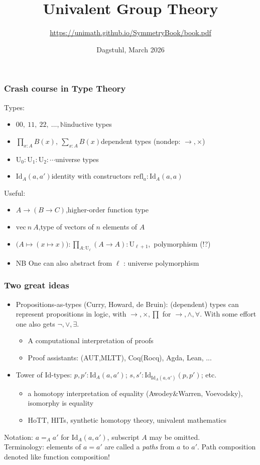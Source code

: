 \documentclass[handout,11pt]{beamer}
\title{Univalent Group Theory}
\author{\url{https://unimath.github.io/SymmetryBook/book.pdf}
}
\date{Dagstuhl, March 2026}
\newcommand{\UU}{\mathrm{U}}
\newcommand{\refl}{\mathrm{refl}}
\newcommand{\NN}{\mathbb{N}}
\newcommand{\bn}[1]{{{#1\!\!\!#1}}}
\newcommand{\Id}{\mathrm{Id}}
\newcommand{\vectype}[2]{\mathrm{vec}~#1~#2}
\begin{document}
\maketitle


\begin{frame}
\frametitle{Crash course in Type Theory}
Types:
 \begin{itemize}[<+->]
\item $\bn{0},~\bn{1},~\bn2,~\ldots,\NN$\quad inductive types
\item $\prod_{x:A}B(x),\ \sum_{x:A}B(x)$\quad dependent types (nondep: $\to,\times$)
\item $\UU_0 : \UU_1 : \UU_2 : \cdots$\quad universe types
\item $\Id_A(a,a')$\quad identity with constructors $\refl_a:\Id_A(a,a)$
\end{itemize}
Useful:
\begin{itemize}[<+->]
\item $A\to(B\to C)$,\quad higher-order function type
\item $\vectype n A$,\quad type of vectors of $n$ elements of $A$
\item $\bigl(A\mapsto (x \mapsto x)\bigr):\prod_{A:\UU_\ell}(A\to A):\UU_{\ell+1}$,\quad polymorphism (!?)
\item NB One can also abstract from $\ell$ : universe polymorphism 
\end{itemize}
\end{frame}

\begin{frame}
\frametitle{Two great ideas}
\begin{itemize}[<+->]
\item Propositions-as-types (Curry, Howard, de Bruin): 
(dependent) types can represent propositions
in logic, with $\to,\times,\prod$ for $\to,\land,\forall$. 
With some effort one also gets $\neg,\lor,\exists$.
\begin{itemize}[<+->]
\item A computational interpretation of proofs
\item Proof assistants: (AUT,MLTT), Coq(Rocq), Agda, Lean, ...
\end{itemize}
\item Tower of $\Id$-types: $p,p':\Id_A(a,a')$; 
$s,s':\Id_{\Id_A(a,a')}(p,p')$; etc.
\begin{itemize}[<+->]
\item a homotopy interpretation of equality (Awodey\&Warren, Voevodsky),
isomorphy is equality
\item HoTT, HITs, synthetic homotopy theory, univalent mathematics
\end{itemize} 
\end{itemize}
\vspace*{1cm}
Notation: $a=_A a'$ for $\Id_A(a,a')$, subscript $A$ may be omitted.\\
Terminology: elements of $a= a'$ are called a \emph{paths} from $a$ to $a'$.
Path composition denoted like function composition! 
\end{frame}
\end{document}
